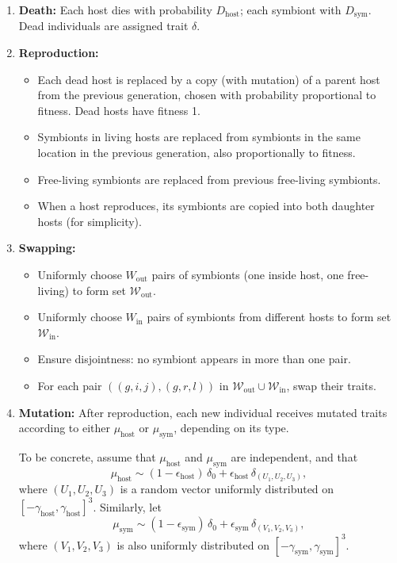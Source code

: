 \documentclass[a4paper]{article}
\begin{document}
\begin{enumerate}
  \item \textbf{Death:}
  Each host dies with probability $D_{\text{host}}$; each symbiont with $D_{\text{sym}}$. Dead individuals are assigned trait $\delta$.

  \item \textbf{Reproduction:}
  \begin{itemize}
    \item Each dead host is replaced by a copy (with mutation) of a parent host from the previous generation, chosen with probability proportional to fitness. Dead hosts have fitness 1.
    \item Symbionts in living hosts are replaced from symbionts in the same location in the previous generation, also proportionally to fitness.
    \item Free-living symbionts are replaced from previous free-living symbionts.
    \item When a host reproduces, its symbionts are copied into both daughter hosts (for simplicity).
  \end{itemize}

  \item \textbf{Swapping:}
  \begin{itemize}
    \item Uniformly choose $W_{\text{out}}$ pairs of symbionts (one inside host, one free-living) to form set $\mathcal{W}_{\text{out}}$.
    \item Uniformly choose $W_{\text{in}}$ pairs of symbionts from different hosts to form set $\mathcal{W}_{\text{in}}$.
    \item Ensure disjointness: no symbiont appears in more than one pair.
    \item For each pair $((g,i,j), (g,r,l))$ in $\mathcal{W}_{\text{out}} \cup \mathcal{W}_{\text{in}}$, swap their traits.
  \end{itemize}

  \item \textbf{Mutation:}
After reproduction, each new individual receives mutated traits according to either $\mu_{\text{host}}$ or $\mu_{\text{sym}}$, depending on its type. 

To be concrete, assume that $\mu_{\text{host}}$ and $\mu_{\text{sym}}$ are independent, and that
\[
\mu_{\text{host}} \sim (1 - \epsilon_{\text{host}})\, \delta_0 + \epsilon_{\text{host}}\, \delta_{(U_1, U_2, U_3)},
\]
where $(U_1, U_2, U_3)$ is a random vector uniformly distributed on $[-\gamma_{\text{host}}, \gamma_{\text{host}}]^3$. Similarly, let
\[
\mu_{\text{sym}} \sim (1 - \epsilon_{\text{sym}})\, \delta_0 + \epsilon_{\text{sym}}\, \delta_{(V_1, V_2, V_3)},
\]
where $(V_1, V_2, V_3)$ is also uniformly distributed on $[-\gamma_{\text{sym}}, \gamma_{\text{sym}}]^3$.


\end{enumerate}
\end{document}
